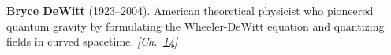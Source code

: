 \textbf{Bryce DeWitt} (1923–2004). American theoretical physicist who pioneered quantum gravity by formulating the Wheeler-DeWitt equation and quantizing fields in curved spacetime. \emph{[Ch.~\hyperref[ch:compacttwinparadox]{14}]}

